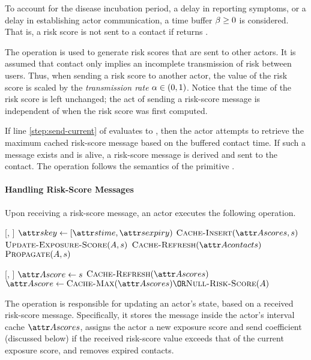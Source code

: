 To account for the disease incubation period, a delay in reporting symptoms, or a delay in establishing actor communication, a time buffer $\beta \geq 0$ is considered. That is, a risk score is not sent to a contact if  returns \false.

The  operation is used to generate risk scores that are sent to other actors. It is assumed that contact only implies an incomplete transmission of risk between users. Thus, when sending a risk score to another actor, the value of the risk score is scaled by the \emph{transmission rate} $\alpha \in (0, 1)$. Notice that the time of the risk score is left unchanged; the act of sending a risk-score message is independent of when the risk score was first computed.

If line \ref{step:send-current} of \cSendCurrentOrCached[] evaluates to \false, then the actor attempts to retrieve the maximum cached risk-score message based on the buffered contact time. If such a message exists and is alive, a risk-score message is derived and sent to the contact. The \cSend[] operation follows the semantics of the  primitive \cite{Agha1985, Agha1990}.

\paragraph{Handling Risk-Score Messages}

Upon receiving a risk-score message, an actor executes the following operation.
%
\begin{function}{\nHandleScoreMessage}[\vActor, \vScore]
        \State $\aScoreKey \assign [\aScoreTime, \aScoreExpiry)$
        \State $\cCacheInsert[\aActorScores, \vScore]$
        \State $\Call{Update-Exposure-Score}{\vActor, \vScore}$
        \State $\cCacheRefresh[\aActorContacts]$
        \State $\cPropagate[\vActor, \vScore]$
    \EndIf
\end{function}
%
\begin{function}{\nUpdateExposureScore}[\vActor, \vScore]
    \If{$\aActorScoreValue < \aScoreValue$}
        \State $\aActorScore \assign \vScore$
        \State $\cCacheRefresh[\aActorScores]$
        \State $\aActorScore \assign \cCacheMax[\aActorScores] \OR \cNullRiskScore[\vActor]$
    \EndIf
\end{function}
%
The  operation is responsible for updating an actor's state, based on a received risk-score message. Specifically, it stores the message inside the actor's interval cache $\aActorScores$, assigns the actor a new exposure score and send coefficient (discussed below) if the received risk-score value exceeds that of the current exposure score, and removes expired contacts.

